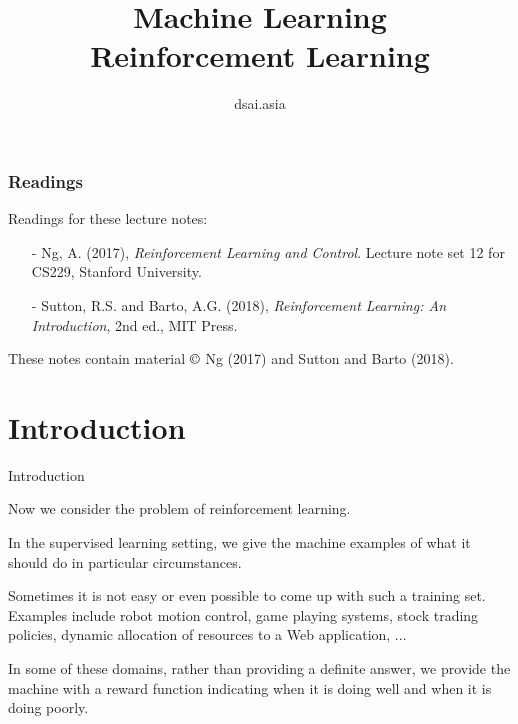 \documentclass{beamer}
\title[Machine Learning]{Machine Learning\\Reinforcement Learning}
\author{dsai.asia}
\institute[]{
  Asian Data Science and Artificial Intelligence Master's Program}
\date{}
\begin{document}


\frame{\titlepage}

%

\begin{frame}
\frametitle{Readings}

Readings for these lecture notes:
\begin{itemize}
\item[-] Ng, A. (2017), \textit{Reinforcement Learning and Control}.
  Lecture note set 12 for CS229, Stanford University.
\item[-] Sutton, R.S. and Barto, A.G. (2018), \textit{Reinforcement
  Learning: An Introduction}, 2nd ed., MIT Press.
\end{itemize}

These notes contain material $\copyright$ Ng (2017) and Sutton and
Barto (2018).

\end{frame}

\section{Introduction}

\begin{frame}{Introduction}

  Now we consider the problem of \alert{reinforcement learning}.

  \medskip

  In the supervised learning setting, we give the machine examples of
  what it should do in particular circumstances.

  \medskip

  Sometimes it is not easy or even possible to come up with such a
  training set.  Examples include robot motion control, game playing
  systems, stock trading policies, dynamic allocation of resources to
  a Web application, ...

  \medskip

  In some of these domains, rather than providing a definite answer,
  we provide the machine with a \alert{reward function} indicating when
  it is doing well and when it is doing poorly.


\end{frame}
\end{document}
